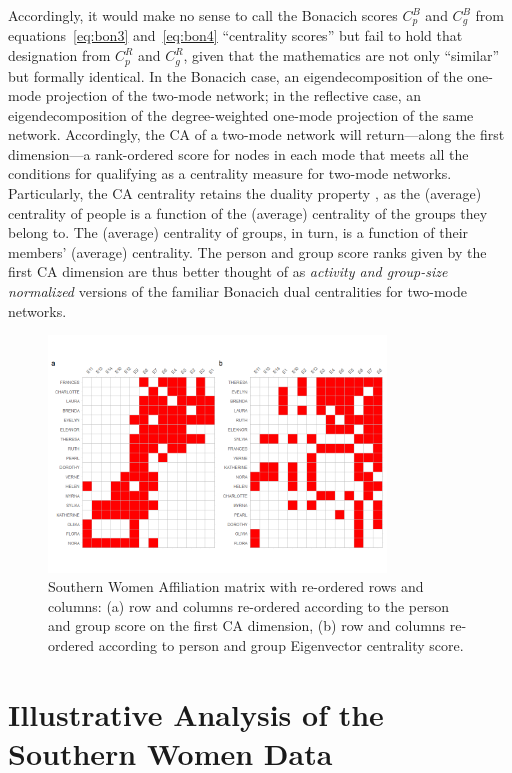 \documentclass[a4paper,fleqn]{cas-sc}
\begin{document}
Accordingly, it would make no sense to call the Bonacich scores $C^B_p$ and $C^B_g$ from equations~\ref{eq:bon3} and~\ref{eq:bon4} ``centrality scores'' but fail to hold that designation from $C^R_p$ and $C^R_g$, given that the mathematics are not only ``similar'' \citep[162]{bonacich1991simultaneous} but formally identical. In the Bonacich case, an eigendecomposition of the one-mode projection of the two-mode network; in the reflective case, an eigendecomposition of the degree-weighted one-mode projection of the same network. Accordingly, the CA of a two-mode network will return---along the first dimension---a rank-ordered score for nodes in each mode that meets all the conditions for qualifying as a centrality measure for two-mode networks. Particularly, the CA centrality retains the duality property \citep[128]{faust2005using}, as the (average) centrality of people is a function of the (average) centrality of the groups they belong to. The (average) centrality of groups, in turn, is a function of their members' (average) centrality. The person and group score ranks given by the first CA dimension are thus better thought of as \textit{activity and group-size normalized} versions of the familiar Bonacich \citeyearpar{bonacich1991simultaneous} dual centralities for two-mode networks.

\begin{figure}
    \centering
    \includegraphics[width=0.8\textwidth]{Plots/ca-v-bon-reord.png}
    \caption{Southern Women Affiliation matrix with re-ordered rows and columns: (a) row and columns re-ordered according to the person and group score on the first CA dimension, (b) row and columns re-ordered according to person and group Eigenvector centrality score.}
    \label{fig:ca-v-bon}
\end{figure}

\section{Illustrative Analysis of the Southern Women Data} \label{sec:anal}
\end{document}
